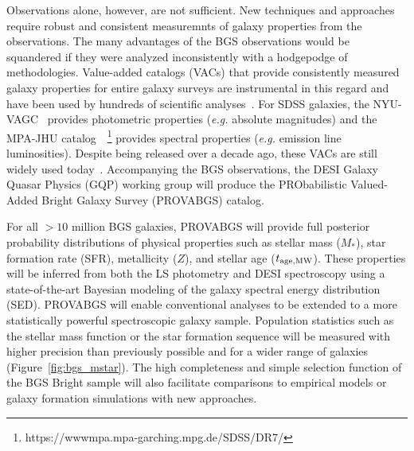 Observations alone, however, are not sufficient.  
New techniques and approaches require robust and consistent measuremnts of
galaxy properties from the observations.
The many advantages of the BGS observations would be squandered if they were 
analyzed inconsistently with a hodgepodge of methodologies.  
Value-added catalogs (VACs) that provide consistently measured galaxy
properties for entire galaxy surveys are instrumental in this regard and have
been used by hundreds of scientific
analyses~\citep[see][for a review]{blanton2009}. 
For SDSS galaxies, the NYU-VAGC~\citep{blanton2005} provides photometric properties
(\emph{e.g.} absolute magnitudes) and the MPA-JHU
catalog~~\citep{brinchmann2004}\footnote{https://wwwmpa.mpa-garching.mpg.de/SDSS/DR7/}
provides spectral properties (\emph{e.g.} emission line
luminosities).
Despite being released over a decade ago, these VACs are still widely used
today~\citep[\emph{e.g.}][]{alpaslan2021, odonnell2021, trevisan2021}. 
Accompanying the BGS observations, the DESI Galaxy Quasar Physics (GQP) working
group will produce the PRObabilistic Valued-Added Bright Galaxy Survey
(PROVABGS) catalog. 

For all ${>}10$ million BGS galaxies, PROVABGS will provide full posterior
probability distributions of physical properties such as stellar mass ($M_*$),
star formation rate (SFR), metallicity ($Z$), and stellar age ($t_{\rm age, MW}$). 
These properties will be inferred from both the LS photometry and DESI
spectroscopy using a state-of-the-art Bayesian modeling of the galaxy spectral
energy distribution (SED). 
PROVABGS will enable conventional analyses to be extended to a more
statistically powerful spectroscopic galaxy sample. 
Population statistics such as the stellar mass function or the star formation
sequence will be measured with higher precision than previously possible and
for a wider range of galaxies (Figure~\ref{fig:bgs_mstar}). 
The high completeness and simple selection function of the BGS Bright sample
will also facilitate  comparisons to empirical models or galaxy formation
simulations with new approaches. 


